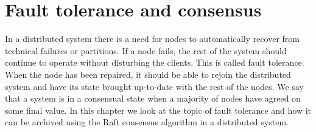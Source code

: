 \chapter{Fault tolerance and consensus} \label{ch:faultToleranceandconsensus}

In a distributed system there is a need for nodes to automatically recover from technical failures or partitions. If a node fails, the rest of the system should continue to operate without disturbing the clients. This is called fault tolerance. When the node has been repaired, it should be able to rejoin the distributed system and have its state brought up-to-date with the rest of the nodes. We say that a system is in a consensual state when a majority of nodes have agreed on some final value. In this chapter we look at the topic of fault tolerance and how it can be archived using the Raft consensus algorithm in a distributed system.




